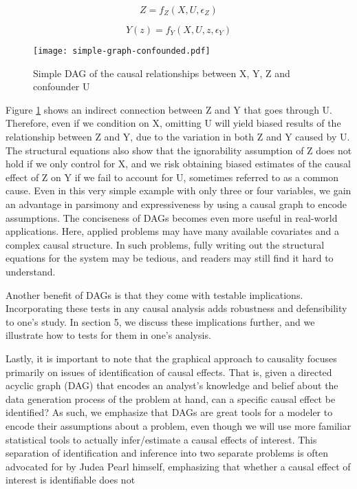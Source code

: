 \[Z = f_Z(X, U, \epsilon_Z)  \]

\[Y(z) = f_Y(X, U, z, \epsilon_Y)  \]

\begin{figure}[h!]
   \centering
   \texttt{[image: simple-graph-confounded.pdf]}
   \caption{Simple DAG of the causal relationships between X, Y, Z and confounder U}
   \label{fig:simple-graph-confounded}
\end{figure}

Figure \ref{fig:simple-graph-confounded} shows an indirect connection between Z and Y that goes through U. 
Therefore, even if we condition on X, omitting U will yield biased results of the relationship between Z and Y, due to the variation in both Z and Y caused by U.
The structural equations also show that the ignorability assumption of Z does not hold if we only control for X, and we risk obtaining biased estimates of the causal effect of Z on Y if we fail to account for U, sometimes referred to as a common cause.
Even in this very simple example with only three or four variables, we gain an advantage in parsimony and expressiveness by using a causal graph to encode assumptions.
The conciseness of DAGs becomes even more useful in real-world applications.
Here, applied problems may have many available covariates and a complex causal structure.
In such problems, fully writing out the structural equations for the system may be tedious, and readers may still find it hard to understand.

Another benefit of DAGs is that they come with testable implications.
Incorporating these tests in any causal analysis adds robustness and defensibility to one's study.
In section 5, we discuss these implications further, and we illustrate how to tests for them in one's analysis.

Lastly, it is important to note that the graphical approach to causality focuses
primarily on issues of identification of causal effects. That is, given a
directed acyclic graph (DAG) that encodes an analyst's knowledge and belief
about the data generation process of the problem at hand, can a specific
causal effect be identified?
As such, we emphasize that DAGs are great tools
for a modeler to encode their assumptions about a problem, even though we will use more familiar statistical tools to actually infer/estimate a causal effects of interest. 
This separation of identification and inference into two separate problems is often advocated for by Judea Pearl himself, emphasizing that whether a causal effect of interest is identifiable does not 

